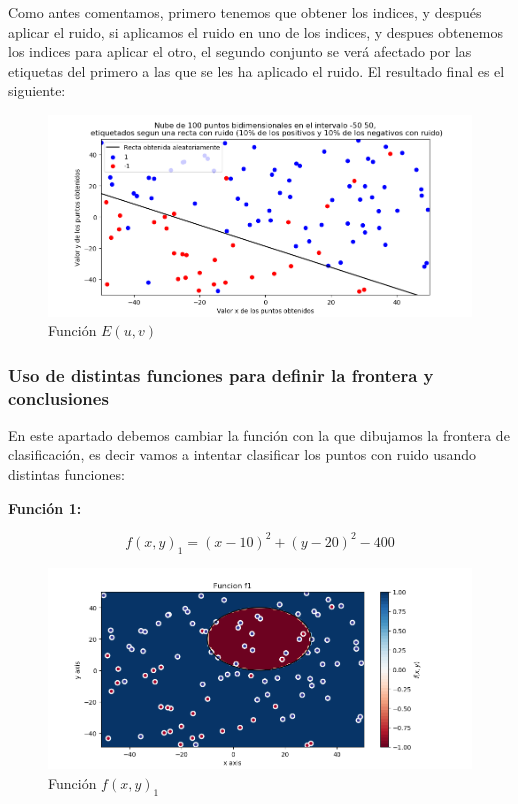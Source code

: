 \documentclass[12pt, spanish]{article}
\begin{document}
Como antes comentamos, primero tenemos que obtener los indices, y después aplicar el ruido, si aplicamos el ruido en uno de los indices, y despues obtenemos los indices para aplicar el otro, el segundo conjunto se verá afectado por las etiquetas del primero a las que se les ha aplicado el ruido. El resultado final es el siguiente:


\begin{figure}[H]
  \centering
      \includegraphics[scale = 0.70]{ej-1-2-2-ruido.png}
 		 \caption{Función $E(u,v)$}
  		\label{fig:ej1-2}

\end{figure}


\subsubsection{Uso de distintas funciones para definir la frontera y conclusiones}

En este apartado debemos cambiar la función con la que dibujamos la frontera de clasificación, es decir vamos a intentar clasificar los puntos con ruido usando distintas funciones:

\textbf{Función 1:} 

$$ f(x, y)_1 = (x - 10)^2 + (y - 20)^2 - 400  $$

\begin{figure}[H]
  \centering
      \includegraphics[scale = 0.70]{ej1-3-f1.png}
 		 \caption{Función $f(x, y)_1$}
  		\label{fig:ej1-f1}

\end{figure}
\end{document}
